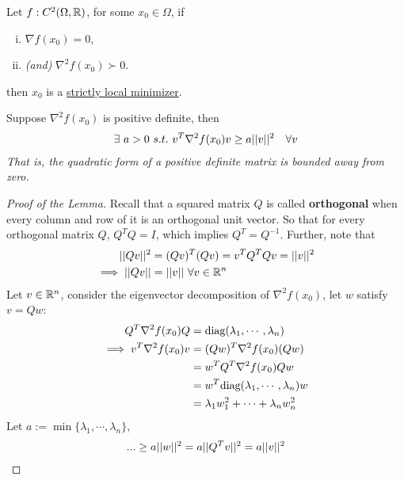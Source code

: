 \documentclass{article}
\begin{document}
   	\begin{theorem}
   		Let $f: C^2(\Omega, \mathbb{R})$, for some $x_0 \in \Omega$, if
   		\begin{enumerate}[(i)]
   			\item $\nabla f(x_0) = 0$,
   			\item \emph{(and)} $\nabla^2 f(x_0) \succ 0$.
   		\end{enumerate}
   		then $x_0$ is a \ul{strictly local minimizer}.
   	\end{theorem}
   	
   	\begin{lemma}
   		Suppose $\nabla^2 f(x_0)$ is positive definite, then 
   		\begin{align}
   			\exists\ a > 0\ s.t.\ v^T \nabla^2 f(x_0) v \geq a \vert \vert {v} \vert \vert^2\quad \forall v
   		\end{align}
   		\emph{That is, the quadratic form of a positive definite matrix is bounded away from zero.}
   	\end{lemma}
   	
   	\begin{proof}[Proof of the Lemma]
   		Recall that a squared matrix $Q$ is called \textbf{orthogonal} when every column and row of it is an orthogonal unit vector. So that for every orthogonal matrix $Q$, $Q^T Q = I$, which implies $Q^T = Q^{-1}$. Further, note that 
   		\begin{align}
   			\vert \vert {Qv} \vert \vert^2 &= (Qv)^T (Qv)
   			= v^T Q^T Q v 
   			= \vert \vert {v} \vert \vert^2 \\
   			\implies \vert \vert {Qv} \vert \vert &= \vert \vert {v} \vert \vert\ \forall v \in \mathbb{R}^n
   		\end{align}
   		Let $v \in \mathbb{R}^n$, consider the eigenvector decomposition of $\nabla^2 f(x_0)$, let $w$ satisfy $v = Qw$:
   		\begin{align}
   			Q^T \nabla^2 f(x_0) Q &= \text{{diag}}(\lambda_1, \cdots, \lambda_n) \\
   			\implies v^T \nabla^2 f(x_0) v &= (Qw)^T \nabla^2 f(x_0) (Qw) \\
   			&= w^T Q^T \nabla^2 f(x_0) Q w \\
   			&= w^T \text{{diag}}(\lambda_1, \cdots, \lambda_n) w \\
   			&= \lambda_1 w_1^2 + \cdots + \lambda_n w_n^2
   		\end{align}
   		Let $a := \min\{\lambda_1, \cdots, \lambda_n\}$,
   		\begin{align}
   			... \geq a \vert \vert {w} \vert \vert^2 = a\vert \vert {Q^T v} \vert \vert^2 = a \vert \vert {v} \vert \vert^2
   		\end{align}
   	\end{proof}
   	
\end{document}
